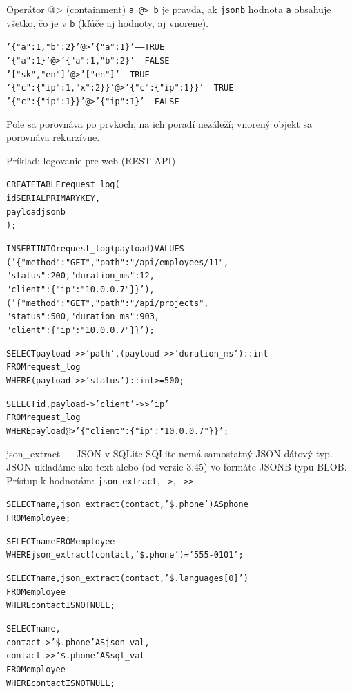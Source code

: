 \documentclass[12pt]{beamer}
\begin{document}
\begin{frame}[fragile]{Operátor @> (containment)}
\verb|a @> b| je pravda, ak \verb|jsonb| hodnota \verb|a| obsahuje všetko, čo je v \verb|b| (kľúče aj hodnoty, aj vnorene).
{\footnotesize
\begin{alltt}
'\{"a": 1, "b": 2\}' \alert{@>} '\{"a": 1\}'    ------ TRUE
'\{"a": 1\}' \alert{@>} '\{"a": 1, "b": 2\}'    ------ FALSE
'["sk", "en"]' \alert{@>} '["en"]'          ------ TRUE
'\{"c": \{"ip": 1, "x": 2\}\}' \alert{@>} '\{"c": \{"ip": 1\}\}' ------ TRUE
'\{"c": \{"ip": 1\}\}' \alert{@>} '\{"ip": 1\}'   ------ FALSE
\end{alltt}
}
Pole sa porovnáva po prvkoch, na ich poradí nezáleží; vnorený objekt sa porovnáva rekurzívne.
\end{frame}

\begin{frame}[fragile]{Príklad: logovanie pre web (REST API)}
{}
{\scriptsize
\begin{alltt}
CREATE TABLE request_log (
  id SERIAL PRIMARY KEY,
  payload \alert{jsonb}
);

INSERT INTO request_log (payload) VALUES
 ('\{"method": "GET", "path": "/api/employees/11",
   "status": 200, "duration_ms": 12,
   "client": \{"ip": "10.0.0.7"\}\}'),
 ('\{"method": "GET", "path": "/api/projects",
   "status": 500, "duration_ms": 903,
   "client": \{"ip": "10.0.0.7"\}\}');

SELECT payload-{}>{}>'path', (payload-{}>{}>'duration\_ms')::int
FROM request_log
WHERE (payload-{}>{}>'status')::int >= 500;

SELECT id, payload->'client'-{}>{}>'ip'
FROM request_log
WHERE payload \alert{@>} '\{"client": \{"ip": "10.0.0.7"\}\}';
\end{alltt}
}
\end{frame}

\begin{frame}[fragile]{json\_extract --- JSON v SQLite}
SQLite nemá samostatný JSON dátový typ. JSON ukladáme ako text alebo (od verzie 3.45) vo formáte JSONB typu BLOB.
Prístup k hodnotám: \alert{\texttt{json\_extract}}, \alert{\texttt{->}}, \alert{\texttt{-{}>{}>}}.
{\footnotesize
\begin{alltt}
SELECT name, \alert{json_extract}(contact, '\$.phone') AS phone
FROM employee;

SELECT name FROM employee
WHERE \alert{json_extract}(contact, '\$.phone') = '555-0101';

SELECT name, \alert{json_extract}(contact, '\$.languages[0]')
FROM employee
WHERE contact IS NOT NULL;
\end{alltt}
}
{\footnotesize
\begin{alltt}
SELECT name,
       contact -> '\$.phone' AS json_val,
       contact \alert{-{}>{}>} '\$.phone' AS sql_val
FROM employee
WHERE contact IS NOT NULL;
\end{alltt}
}
\end{frame}
\end{document}
